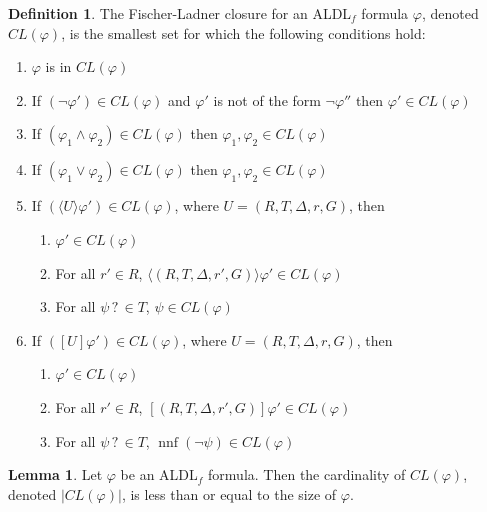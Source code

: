 \documentclass{lmcs}
\theoremstyle{definition}
\newtheorem{lemma}[thm]{Lemma}
\newtheorem{definition}[thm]{Definition}
\newcommand{\dbox}[1]{\langle #1 \rangle}
\newcommand{\bbox}[1]{[ #1 ]}
\DeclareMathOperator{\nnf}{nnf}
\DeclareMathOperator{\?}{?}
\begin{document}
\begin{definition}
    The Fischer-Ladner closure for an ALDL$_f$ formula $\varphi$, denoted $CL(\varphi)$, is the smallest set for which
    the following conditions hold:
\begin{enumerate}
    \item $\varphi$ is in $CL(\varphi)$
    \item If $(\neg\varphi') \in CL(\varphi)$ and $\varphi'$ is not of the form $\neg\varphi''$ then $\varphi' \in CL(\varphi)$
    \item If $(\varphi_1 \wedge \varphi_2) \in CL(\varphi)$ then $\varphi_1,\varphi_2 \in CL(\varphi)$
    \item If $(\varphi_1 \vee \varphi_2) \in CL(\varphi)$ then $\varphi_1,\varphi_2 \in CL(\varphi)$
    \item If $(\dbox{U}\varphi') \in CL(\varphi)$,
    where $U = (R,T,\Delta,r,G)$, then
    \begin{enumerate}[label=(\roman*)]
        \item $\varphi' \in CL(\varphi)$
        \item For all $r' \in R$, $\dbox{(R,T,\Delta,r',G)}\varphi' \in CL(\varphi)$
        \item For all $\psi\? \in T$, $\psi \in CL(\varphi)$
    \end{enumerate}
    \item If $(\bbox{U}\varphi') \in CL(\varphi)$, where $U = (R,T,\Delta,r,G)$, then
    \begin{enumerate}[label=(\roman*)]
        \item $\varphi' \in CL(\varphi)$
        \item For all $r' \in R$, $\bbox{(R,T,\Delta,r',G)}\varphi' \in CL(\varphi)$
        \item For all $\psi\? \in T$, $\nnf(\neg\psi) \in CL(\varphi)$
    \end{enumerate}

\end{enumerate}
\end{definition}

\begin{lemma}

  Let $\varphi$ be an ALDL$_f$ formula. Then the cardinality of $CL(\varphi)$, denoted $|CL(\varphi)|$, is less than or equal to the size of $\varphi$.

\end{lemma}
\end{document}

